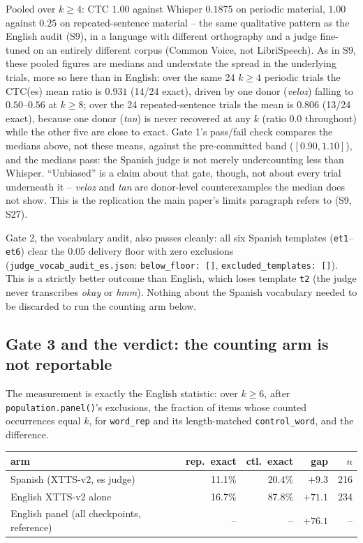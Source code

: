 \documentclass[11pt]{article}
\begin{document}
\noindent Pooled over $k{\ge}4$: CTC $1.00$ against Whisper $0.1875$ on
periodic material, $1.00$ against $0.25$ on repeated-sentence material -- the
same qualitative pattern as the English audit (S9), in a language with
different orthography and a judge fine-tuned on an entirely different corpus
(Common Voice, not LibriSpeech). As in S9, these pooled figures are medians
and understate the spread in the underlying trials, more so here than in
English: over the same 24 $k\ge4$ periodic trials the CTC(es) mean ratio is
$0.931$ (14/24 exact), driven by one donor (\emph{veloz}) falling to
$0.50$--$0.56$ at $k\ge8$; over the 24 repeated-sentence trials the mean is
$0.806$ (13/24 exact), because one donor (\emph{tan}) is never recovered at
any $k$ (ratio $0.0$ throughout) while the other five are close to exact.
Gate 1's pass/fail check compares the medians above, not these means, against
the pre-committed band ($[0.90,1.10]$), and the medians pass: the Spanish
judge is not merely undercounting less than Whisper. ``Unbiased'' is a claim
about that gate, though, not about every trial underneath it -- \emph{veloz}
and \emph{tan} are donor-level counterexamples the median does not show. This
is the replication the main paper's limits paragraph refers to (S9, S27).

Gate 2, the vocabulary audit, also passes cleanly: all six Spanish templates
(\texttt{et1}--\texttt{et6}) clear the $0.05$ delivery floor with zero
exclusions (\texttt{judge\_vocab\_audit\_es.json}: \texttt{below\_floor: []},
\texttt{excluded\_templates: []}). This is a strictly better outcome than
English, which loses template \texttt{t2} (the judge never transcribes
\emph{okay} or \emph{hmm}). Nothing about the Spanish vocabulary needed to be
discarded to run the counting arm below.

\subsection{Gate 3 and the verdict: the counting arm is not reportable}

The measurement is exactly the English statistic: over $k\ge6$, after
\texttt{population.panel()}'s exclusions, the fraction of items whose counted
occurrences equal $k$, for \texttt{word\_rep} and its length-matched
\texttt{control\_word}, and the difference.

\begin{center}
\begin{tabular}{@{}lrrrr@{}}
\toprule
arm & rep.\ exact & ctl.\ exact & gap & $n$ \\
\midrule
Spanish (XTTS-v2, es judge)   & 11.1\% & 20.4\% & $+9.3$  & 216 \\
English XTTS-v2 alone         & 16.7\% & 87.8\% & $+71.1$ & 234 \\
English panel (all checkpoints, reference) & -- & -- & $+76.1$ & -- \\
\bottomrule
\end{tabular}
\end{center}
\end{document}
